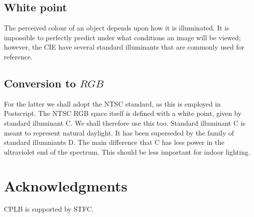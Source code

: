 \documentclass[useAMS,usedcolumn,usegraphicx,usenatbib]{mn2e}
\begin{document}
\subsection{White point}

The perceived colour of an object depends upon how it is illuminated. It is impossible to perfectly predict under what conditions an image will be viewed; however, the CIE have several standard illuminants that are commonly used for reference.

\subsection{Conversion to $RGB$}

For the latter we shall adopt the NTSC standard, as this is employed in Postscript. The NTSC RGB space itself is defined with a white point, given by standard illuminant C. We shall therefore use this too. Standard illuminant C is meant to represent natural daylight. It has been superseded by the family of standard illumniants D. The main difference that C has less power in the ultraviolet end of the spectrum.  This should be less important for indoor lighting.

\section*{Acknowledgments}

CPLB is supported by STFC.




\appendix



\bsp

\label{lastpage}
\end{document}
